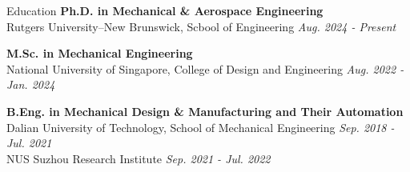 \documentclass{resume} %
\begin{document}
\begin{rSection}{Education}
{\bf Ph.D. in Mechanical \& Aerospace Engineering} \\
Rutgers University–New Brunswick, Scbool of Engineering \hfill {\em Aug. 2024 - Present}\\	

\vspace{-1em}

{\bf M.Sc. in Mechanical Engineering} \\
National University of Singapore, College of Design and Engineering \hfill {\em Aug. 2022 - Jan. 2024}\\

\vspace{-1em}

{\bf B.Eng. in Mechanical Design \& Manufacturing and Their Automation} \\
Dalian University of Technology, School of Mechanical Engineering \hfill {\em Sep. 2018 - Jul. 2021}\\
NUS Suzhou Research Institute
\hfill {\em Sep. 2021 - Jul. 2022}\\
\end{rSection}

\vspace{-1em}


\end{document}

